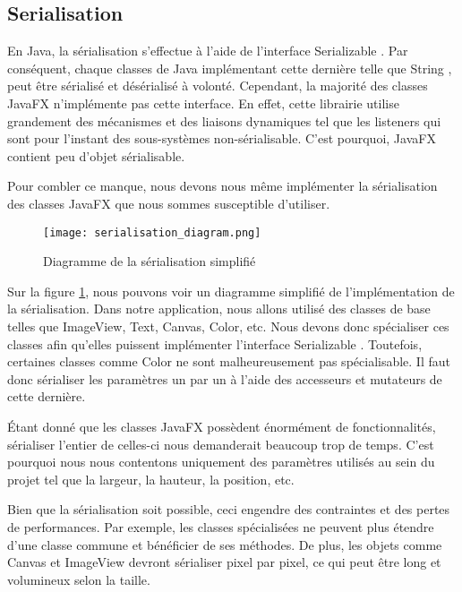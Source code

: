 \subsection{Serialisation}
En Java, la sérialisation s'effectue à l'aide de l'interface \og Serializable \fg{}. Par conséquent, chaque classes de Java implémentant cette dernière telle que \og String \fg{}, peut être sérialisé et désérialisé à volonté. Cependant, la majorité des classes JavaFX n'implémente pas cette interface. En effet, cette librairie utilise grandement des mécanismes et des liaisons dynamiques tel que les listeners qui sont pour l'instant des sous-systèmes non-sérialisable. C'est pourquoi, JavaFX contient peu d'objet sérialisable.

Pour combler ce manque, nous devons nous même implémenter la sérialisation des classes JavaFX que nous sommes susceptible d'utiliser. 

\begin{figure}[h]
    \caption{Diagramme de la sérialisation simplifié}
    \centering
    \texttt{[image: serialisation\_diagram.png]}
    \label{fig:seri_diag}
\end{figure}

Sur la figure \ref{fig:seri_diag}, nous pouvons voir un diagramme simplifié de l'implémentation de la sérialisation. Dans notre application, nous allons utilisé des classes de base telles que ImageView, Text, Canvas, Color, etc. Nous devons donc spécialiser ces classes afin qu'elles puissent implémenter l'interface \og Serializable \fg{}. Toutefois, certaines classes comme \og Color \fg{} ne sont malheureusement pas spécialisable. Il faut donc sérialiser les paramètres un par un à l'aide des accesseurs et mutateurs de cette dernière.

Étant donné que les classes JavaFX possèdent énormément de fonctionnalités, sérialiser l'entier de celles-ci nous demanderait beaucoup trop de temps. C'est pourquoi nous nous contentons uniquement des paramètres utilisés au sein du projet tel que la largeur, la hauteur, la position, etc. 



Bien que la sérialisation soit possible, ceci engendre des contraintes et des pertes de performances. Par exemple, les classes spécialisées ne peuvent plus étendre d'une classe commune et bénéficier de ses méthodes. De plus, les objets comme Canvas et ImageView devront sérialiser pixel par pixel, ce qui peut être long et volumineux selon la taille.


